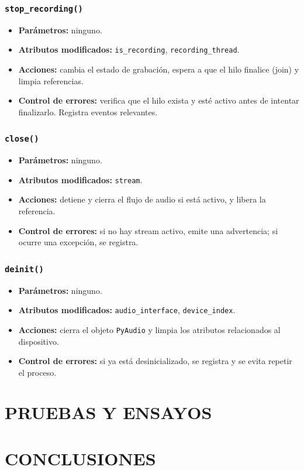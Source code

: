 \subsubsection*{\texttt{stop\_recording()}}

\begin{itemize}
    \item \textbf{Parámetros:} ninguno.
    \item \textbf{Atributos modificados:} \texttt{is\_recording}, \texttt{recording\_thread}.
    \item \textbf{Acciones:} cambia el estado de grabación, espera a que el hilo finalice (join) y limpia referencias.
    \item \textbf{Control de errores:} verifica que el hilo exista y esté activo antes de intentar finalizarlo. Registra eventos relevantes.
\end{itemize}

\subsubsection*{\texttt{close()}}

\begin{itemize}
    \item \textbf{Parámetros:} ninguno.
    \item \textbf{Atributos modificados:} \texttt{stream}.
    \item \textbf{Acciones:} detiene y cierra el flujo de audio si está activo, y libera la referencia.
    \item \textbf{Control de errores:} si no hay stream activo, emite una advertencia; si ocurre una excepción, se registra.
\end{itemize}

\subsubsection*{\texttt{deinit()}}

\begin{itemize}
    \item \textbf{Parámetros:} ninguno.
    \item \textbf{Atributos modificados:} \texttt{audio\_interface}, \texttt{device\_index}.
    \item \textbf{Acciones:} cierra el objeto \texttt{PyAudio} y limpia los atributos relacionados al dispositivo.
    \item \textbf{Control de errores:} si ya está desinicializado, se registra y se evita repetir el proceso.
\end{itemize}





\clearpage
\section{PRUEBAS Y ENSAYOS}

\clearpage
\section{CONCLUSIONES}

%